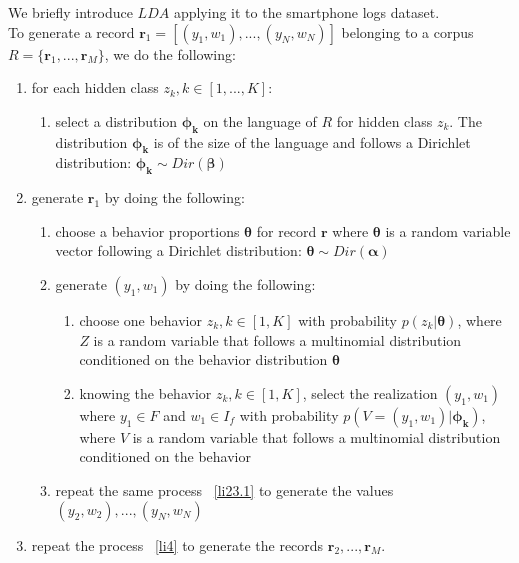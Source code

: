 We briefly introduce $LDA$ applying it to the smartphone logs dataset.
\\To generate a record $\mathbf{r}_{1}=[(y_{1},w_{1}),...,(y_{N},w_{N})]$ belonging to a corpus $R=\{\mathbf{r}_{1},...,\mathbf{r}_{M}\}$, we do the following:
\begin{enumerate} 
	\item for each hidden class $z_{k}, k\in[1,...,K]$:
		\begin{enumerate}
		 	\item select a distribution $\boldsymbol{\phi _{k}}$ on the language of $R$ for hidden class $z_{k}$. The distribution $\boldsymbol{\phi _{k}}$ is of the size of the language and follows a Dirichlet distribution: $					\boldsymbol{\phi _{k}}\sim Dir(\boldsymbol{\beta})$ \label{li22}
		\end{enumerate}
	\item generate $\mathbf{r}_{1}$ by doing the following: \label{li4}
		\begin{enumerate}
			\item choose a behavior proportions $\boldsymbol{\theta }$ for record $\mathbf{r}$ where $\boldsymbol{\theta }$ is a random variable vector following a Dirichlet distribution: $\boldsymbol{\theta }\sim 								Dir(\boldsymbol{\alpha })$ \label{li22} 
			\item generate $(y_{1},w_{1})$ by doing the following: \label{li23.1}
	 			\begin{enumerate}
		 			\item choose one behavior $z_{k},k\in [1,K]$ with probability $p(z_{k}|\boldsymbol{\theta })$, where $Z$ is a random variable that follows a multinomial distribution conditioned on the behavior distribution $						\boldsymbol{\theta }$
		 			\item knowing the behavior $z_{k},k\in [1,K]$, select the realization $(y_{1},w_{1})$ where $y_{1}\in F$ and $w_{1}\in I_{f}$ with probability $p(V=(y_{1},w_{1})|\boldsymbol{\phi _{k}})$, where $V$ is a 							random variable that follows a multinomial distribution conditioned on the behavior
				 \end{enumerate}
			\item repeat the same process ~\ref{li23.1} to generate the values $(y_{2},w_{2}),...,(y_{N},w_{N})$ 
		\end{enumerate}
	\item repeat the process ~\ref{li4} to generate the records $\mathbf{r}_{2},...,\mathbf{r}_{M}$.
\end{enumerate} \par

